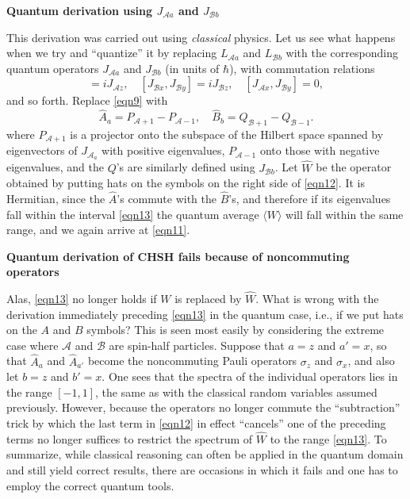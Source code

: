 \documentclass[10pt]{article} %
\def\outl#1{\par{\medskip\noindent\hspace*{.5cm}\bf
      \mathversion{bold}#1\mathversion{normal}\smallskip} }
\def\np{} \def\xa{} \def\xb{} \def\xn{} \def\xp{}
\def\outl#1{} \def\np{} \def\xa{} \def\xb{} \def\xn{} \def\xp{}
\def\outl#1{\par{\medskip\noindent\hspace*{.5cm}\bf
      \mathversion{bold}#1\mathversion{normal}\smallskip} }
\def\np{\newpage }\def\xn{\nopagebreak }\def\xp{\pagebreak }
\newcommand{\avg}[1]{\langle #1\rangle }
\newcommand{\AM}{{\mathcal A}}
\newcommand{\BM}{{\mathcal B}}
\newcommand{\sg}{\sigma }
\begin{document}
\xb
\outl{Quantum derivation using $J_{\AM a}$ and $J_{\BM b}$}
\xa


This derivation was carried out using \emph{classical} physics. Let us see
what happens when we try and ``quantize'' it by replacing $L_{\AM a}$ and
$L_{\BM b}$ with the corresponding quantum operators $J_{\AM a}$ and $J_{\BM
  b}$ (in units of $\hbar$), with commutation relations
\begin{equation}
  [J_{\AM x},J_{\AM y}] = i J_{\AM z}, \quad
  [J_{\BM x},J_{\BM y}] = i J_{\BM z}, \quad
  [J_{\AM x},J_{\BM y}] = 0,
\label{eqn14}
\end{equation}
and so forth. 
Replace \eqref{eqn9} with
\begin{equation}
 \hat  A_a = P_{\AM +1} - P_{\AM -1},\quad
 \hat B_b = Q_{\BM +1} - Q_{\BM -1}.
\label{eqn15}
\end{equation}
where $P_{\AM +1}$ is a projector onto the subspace of the
Hilbert space spanned by eigenvectors of $J_{\AM_a}$ with positive eigenvalues, 
$P_{\AM -1}$ onto those with negative eigenvalues, and the $Q$'s are
similarly defined using $J_{\BM b}$. Let $\hat W$ be the operator obtained by
putting hats on the symbols on the right side of \eqref{eqn12}. It
is Hermitian, since the $\hat A$'s commute with the $\hat B$'s, and therefore
if its eigenvalues fall within the interval \eqref{eqn13} the quantum average
$\avg{W}$ will fall within the same range, and we again arrive at 
\eqref{eqn11}.  

\xb
\outl{Quantum derivation of CHSH fails because of noncommuting operators}
\xa


Alas, \eqref{eqn13} no longer holds if $W$ is replaced by $\hat W$.  What is
wrong with the derivation immediately preceding \eqref{eqn13} in the quantum
case, i.e., if we put hats on the $A$ and $B$ symbols?  This is seen most
easily by considering the extreme case where $\AM$ and $\BM$ are spin-half
particles.  Suppose that $a=z$ and $a'=x$, so that $\hat A_a$ and $\hat
A_{a'}$ become the noncommuting Pauli operators $\sg_z$ and $\sg_x$, and also
let $b=z$ and $b'=x$.  One sees that the spectra of the individual operators
lies in the range $[-1,1]$, the same as with the classical random variables
assumed previously.  However, because the operators no longer commute the
``subtraction'' trick by which the last term in \eqref{eqn12} in effect
``cancels'' one of the preceding terms no longer suffices to restrict the
spectrum of $\hat W$ to the range \eqref{eqn13}.  To summarize, while
classical reasoning can often be applied in the quantum domain and still yield
correct results, there are occasions in which it fails and one has to employ
the correct quantum tools.
\end{document}
